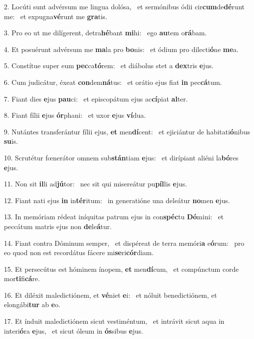 2. Locúti sunt advérsum me lingua dolósa, \dag\  et sermónibus ódii cir\textbf{cum}de\textbf{dé}runt me: \ast\  et expugna\textbf{vé}runt me \textbf{gra}tis.\

3. Pro eo ut me dilígerent, detra\textbf{hé}bant \textbf{mi}hi: \ast\  ego \textbf{au}tem o\textbf{rá}bam.\

4. Et posuérunt advérsum me \textbf{ma}la pro \textbf{bo}nis: \ast\  et ódium pro dilecti\textbf{ó}ne \textbf{me}a.\

5. Constítue super eum \textbf{pec}ca\textbf{tó}rem: \ast\  et diábolus stet a \textbf{dex}tris \textbf{e}jus.\

6. Cum judicátur, éxeat \textbf{con}dem\textbf{ná}tus: \ast\  et orátio ejus fiat \textbf{in} pec\textbf{cá}tum.\

7. Fiant dies \textbf{e}jus \textbf{pau}ci: \ast\  et episcopátum ejus ac\textbf{cí}piat \textbf{al}ter.\

8. Fiant fílii \textbf{e}jus \textbf{ór}phani: \ast\  et uxor \textbf{e}jus \textbf{ví}dua.\

9. Nutántes transferántur fílii ejus, \textbf{et} men\textbf{dí}cent: \ast\  et ejiciántur de habitati\textbf{ó}nibus \textbf{su}is.\

10. Scrutétur fœnerátor omnem sub\textbf{stán}tiam \textbf{e}jus: \ast\  et dirípiant aliéni la\textbf{bó}res \textbf{e}jus.\

11. Non sit \textbf{il}li ad\textbf{jú}tor: \ast\  nec sit qui misereátur pu\textbf{píl}lis \textbf{e}jus.\

12. Fiant nati ejus \textbf{in} in\textbf{tér}itum: \ast\  in generatióne una deleátur \textbf{no}men \textbf{e}jus.\

13. In memóriam rédeat iníquitas patrum ejus in con\textbf{spéc}tu \textbf{Dó}mini: \ast\  et peccátum matris ejus non \textbf{de}le\textbf{á}tur.\

14. Fiant contra Dóminum semper, \dag\  et dispéreat de terra memóri\textbf{a} e\textbf{ó}rum: \ast\  pro eo quod non est recordátus fácere mi\textbf{se}ri\textbf{cór}diam.\

15. Et persecútus est hóminem ínopem, \textbf{et} men\textbf{dí}cum, \ast\  et compúnctum corde mor\textbf{ti}fi\textbf{cá}re.\

16. Et diléxit maledictiónem, et \textbf{vé}niet \textbf{e}i: \ast\  et nóluit benedictiónem, et elongábi\textbf{tur} ab \textbf{e}o.\

17. Et índuit maledictiónem sicut vestiméntum, \dag\  et intrávit sicut aqua in interi\textbf{ó}ra \textbf{e}jus, \ast\  et sicut óleum in \textbf{ós}sibus \textbf{e}jus.\

